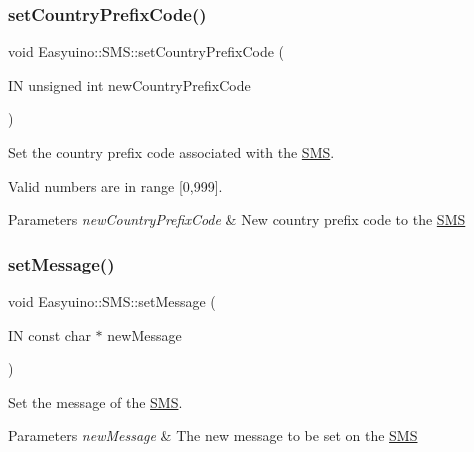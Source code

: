 \subsubsection{\texorpdfstring{set\+Country\+Prefix\+Code()}{setCountryPrefixCode()}}
{\footnotesize\ttfamily void Easyuino\+::\+S\+M\+S\+::set\+Country\+Prefix\+Code (\begin{DoxyParamCaption}\item[{IN unsigned int}]{new\+Country\+Prefix\+Code }\end{DoxyParamCaption})}



Set the country prefix code associated with the \hyperlink{class_easyuino_1_1_s_m_s}{S\+MS}. 

Valid numbers are in range \mbox{[}0,999\mbox{]}. 
\begin{DoxyParams}{Parameters}
{\em new\+Country\+Prefix\+Code} & New country prefix code to the \hyperlink{class_easyuino_1_1_s_m_s}{S\+MS} \\
\hline
\end{DoxyParams}
\mbox{\label{class_easyuino_1_1_s_m_s_a7c0fdcb9b1a54cf025c6b98618badc21}} 
\subsubsection{\texorpdfstring{set\+Message()}{setMessage()}}
{\footnotesize\ttfamily void Easyuino\+::\+S\+M\+S\+::set\+Message (\begin{DoxyParamCaption}\item[{IN const char $\ast$}]{new\+Message }\end{DoxyParamCaption})}



Set the message of the \hyperlink{class_easyuino_1_1_s_m_s}{S\+MS}. 


\begin{DoxyParams}{Parameters}
{\em new\+Message} & The new message to be set on the \hyperlink{class_easyuino_1_1_s_m_s}{S\+MS} \\
\hline
\end{DoxyParams}
\mbox{\label{class_easyuino_1_1_s_m_s_a6d9b21c6480b7e859dfb16688090ed1c}} 
